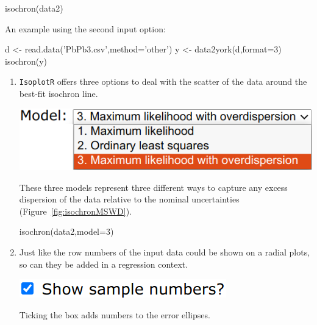 \begin{refsection}
\begin{console}
isochron(data2)
\end{console}

An example using the second input option:

\begin{script}
d <- read.data('PbPb3.csv',method='other')
y <- data2york(d,format=3)
isochron(y)
\end{script}

\begin{enumerate}

\item \texttt{IsoplotR} offers three options to deal with the scatter of the
  data around the best-fit isochron line.

\noindent\begin{minipage}[t]{.45\linewidth}
\strut\vspace*{-\baselineskip}\newline
\includegraphics[width=\linewidth]{../figures/OtherRegressionModels.png}
\end{minipage}
\begin{minipage}[t]{.55\linewidth}
  These three models represent three different ways to capture any
  excess dispersion of the data relative to the nominal uncertainties
  (Figure~\ref{fig:isochronMSWD}).
\end{minipage}

\begin{console}
isochron(data2,model=3)
\end{console}
  
\item Just like the row numbers of the input data could be shown on a
  radial plots, so can they be added in a regression context.

  \noindent\begin{minipage}[t]{.28\linewidth}
  \strut\vspace*{-\baselineskip}\newline
  \includegraphics[width=\linewidth]{../figures/concordiashownumbers.png}
\end{minipage}
\begin{minipage}[t]{.72\linewidth}
Ticking the box adds numbers to the error ellipses.
\end{minipage}


\end{enumerate}
\end{refsection}
